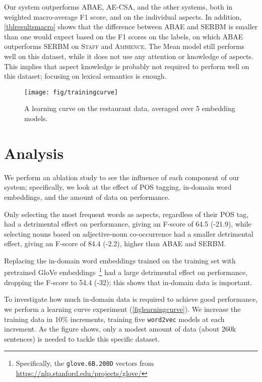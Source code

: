 \documentclass[11pt,a4paper]{article}
\begin{document}
Our system outperforms ABAE, AE-CSA, and the other systems, both in weighted macro-average F1 score, and on the individual aspects.
In addition, \ref{tblresultsmacro} shows that the difference between ABAE and SERBM is smaller than one would expect based on the F1 scores on the labels, on which ABAE outperforms SERBM on \textsc{Staff} and \textsc{Ambience}.
The Mean model still performs well on this dataset,
while it does not use any attention or knowledge of aspects.
This implies that aspect knowledge is probably not required to perform well on this dataset; focusing on lexical semantics is enough.




\begin{figure}[t]\centering
    \texttt{[image: fig/trainingcurve]}
    \caption{A learning curve on the restaurant data, averaged over 5 embedding models.}
    \label{figlearningcurve}
\end{figure}

\section{Analysis}\label{secanalysis}
We perform an ablation study to see the influence of each component of our system;
specifically, we look at the effect of POS tagging, in-domain word embeddings, and the amount of data on performance.

Only selecting the most frequent words as aspects, regardless of their POS tag, had a detrimental effect on performance, giving an F-score of 64.5 (-21.9), while selecting nouns based on adjective-noun co-occurrence had a smaller detrimental effect, giving an F-score of 84.4 (-2.2), higher than ABAE and SERBM.

Replacing the in-domain word embeddings trained on the training set
with pretrained GloVe embeddings~\citep{pennington2014glove}\footnote{Specifically, the \texttt{glove.6B.200D} vectors from \url{https://nlp.stanford.edu/projects/glove/}}
had a large detrimental effect on performance, dropping the F-score to 54.4 (-32); this shows that in-domain data is important.

To investigate how much in-domain data is required to achieve good performance, we perform a learning curve experiment (\autoref{figlearningcurve}).
We increase the training data in 10\% increments,
training five \texttt{word2vec} models at each increment.
As the figure shows, only a modest amount of data
(about 260k sentences) is needed to tackle this specific dataset.
\end{document}
